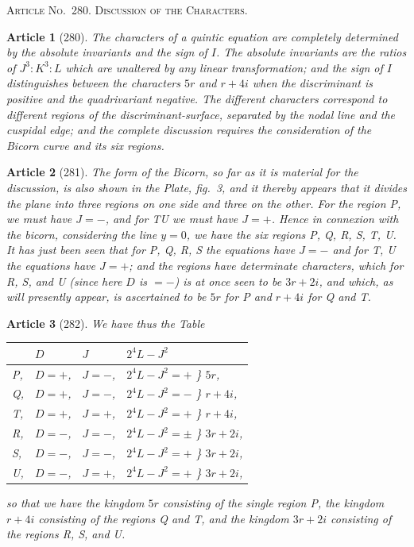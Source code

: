 \documentclass[11pt,a4paper]{article}
\theoremstyle{cayley}
\newtheorem{art}{Article}
\begin{document}
\begin{center}
\textsc{Article No.\ 280. Discussion of the Characters.}
\end{center}

\begin{art}[280]
The characters of a quintic equation are completely determined by the absolute invariants and the sign of $I$. The absolute invariants are the ratios of $J^3 : K^3 : L$ which are unaltered by any linear transformation; and the sign of $I$ distinguishes between the characters $5r$ and $r+4i$ when the discriminant is positive and the quadrivariant negative. The different characters correspond to different regions of the discriminant-surface, separated by the nodal line and the cuspidal edge; and the complete discussion requires the consideration of the Bicorn curve and its six regions.
\end{art}

\begin{art}[281]
The form of the Bicorn, so far as it is material for the discussion, is also shown in the Plate, fig.~3, and it thereby appears that it divides the plane into three regions on one side and three on the other. For the region P, we must have $J=-$, and for TU we must have $J=+$. Hence in connexion with the bicorn, considering the line $y=0$, we have the six regions P, Q, R, S, T, U. It has just been seen that for P, Q, R, S the equations have $J=-$ and for T, U the equations have $J=+$; and the regions have determinate characters, which for R, S, and U (since here $D$ is $=-$) is at once seen to be $3r+2i$, and which, as will presently appear, is ascertained to be $5r$ for P and $r+4i$ for Q and T.
\end{art}

\begin{art}[282]
We have thus the Table
\begin{center}
\begin{tabular}{llll}
\toprule
 & $D$ & $J$ & $2^4L-J^2$ \\
\midrule
P, & $D=+$, & $J=-$, & $2^4L-J^2=+$ \quad\} \quad $5r$, \\
Q, & $D=+$, & $J=-$, & $2^4L-J^2=-$ \quad\} \quad $r+4i$, \\
T, & $D=+$, & $J=+$, & $2^4L-J^2=+$ \quad\} \quad $r+4i$, \\
R, & $D=-$, & $J=-$, & $2^4L-J^2=\pm$ \quad\} \quad $3r+2i$, \\
S, & $D=-$, & $J=-$, & $2^4L-J^2=+$ \quad\} \quad $3r+2i$, \\
U, & $D=-$, & $J=+$, & $2^4L-J^2=+$ \quad\} \quad $3r+2i$, \\
\bottomrule
\end{tabular}
\end{center}
so that we have the kingdom $5r$ consisting of the single region P, the kingdom $r+4i$ consisting of the regions Q and T, and the kingdom $3r+2i$ consisting of the regions R, S, and U.
\end{art}
\end{document}
